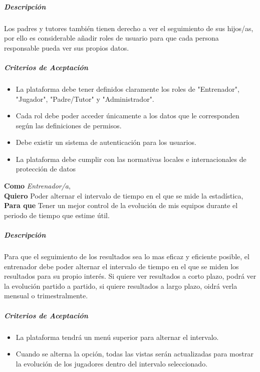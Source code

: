\subparagraph{Descripción}
Los padres y tutores también tienen derecho a ver el seguimiento de sus hijos/as, por ello es considerable añadir roles de usuario para que cada persona responsable pueda ver sus propios datos.

\subparagraph{Criterios de Aceptación}
\begin{itemize}
    \item La plataforma debe tener definidos claramente los roles de "Entrenador", "Jugador", "Padre/Tutor" y "Administrador".
    \item Cada rol debe poder acceder únicamente a los datos que le corresponden según las definiciones de permisos.
    \item Debe existir un sistema de autenticación para los usuarios.
    \item La plataforma debe cumplir con las normativas locales e internacionales de protección de datos
\end{itemize}

\begin{tcolorbox}[title=Historia de Usuario: Intervalos Estadísticos para el menú]
\textbf{Como} \textit{Entrenador/a},\\
\textbf{Quiero} Poder alternar el intervalo de tiempo en el que se mide la estadística,\\
\textbf{Para que} Tener un mejor control de la evolución de mis equipos durante el periodo de tiempo que estime útil.
\end{tcolorbox}

\subparagraph{Descripción}
Para que el seguimiento de los resultados sea lo mas eficaz y eficiente posible, el entrenador debe poder alternar el intervalo de tiempo en el que se miden los resultados para su propio interés. Si quiere ver resultados a corto plazo, podrá ver la evolución partido a partido, si quiere resultados a largo plazo, oidrá verla mensual o trimestralmente.

\subparagraph{Criterios de Aceptación}
\begin{itemize}
    \item La plataforma tendrá un menú superior para alternar el intervalo.
    \item Cuando se alterna la opción, todas las vistas serán actualizadas para mostrar la evolución de los jugadores dentro del intervalo seleccionado.
\end{itemize}



